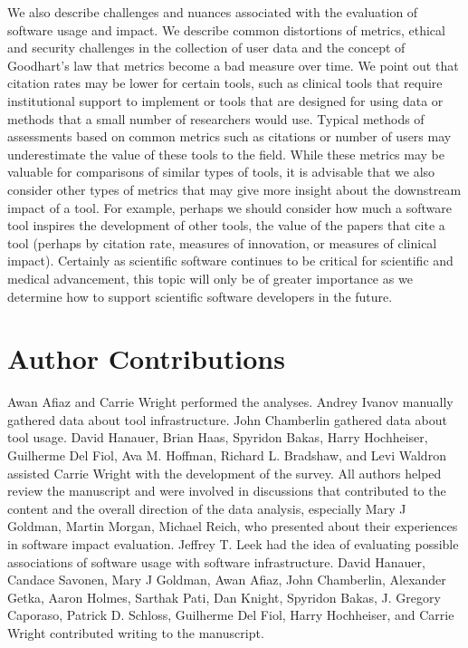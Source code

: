 \documentclass{article}
\begin{document}
We also describe challenges and nuances associated with the evaluation of software usage and impact. We describe common distortions of metrics, ethical and security challenges in the collection of user data and the concept of Goodhart's law that metrics become a bad measure over time. We point out that citation rates may be lower for certain tools, such as clinical tools that require institutional support to implement or tools that are designed for using data or methods that a small number of researchers would use. Typical methods of assessments based on common metrics such as citations or number of users may underestimate the value of these tools to the field. While these metrics may be valuable for comparisons of similar types of tools, it is advisable that we also consider other types of metrics that may give more insight about the downstream impact of a tool. For example, perhaps we should consider how much a software tool inspires the development of other tools, the value of the papers that cite a tool (perhaps by citation rate, measures of innovation, or measures of clinical impact). Certainly as scientific software continues to be critical for scientific and medical advancement, this topic will only be of greater importance as we determine how to support scientific software developers in the future. 
 
 
\section{Author Contributions}


Awan Afiaz and Carrie Wright performed the analyses. Andrey Ivanov manually gathered data about tool infrastructure. John Chamberlin gathered data about tool usage. David Hanauer, Brian Haas, Spyridon Bakas, Harry Hochheiser, Guilherme Del Fiol, Ava M. Hoffman, Richard L. Bradshaw, and Levi Waldron assisted Carrie Wright with the development of the survey.  All authors helped review the manuscript and were involved in discussions that contributed to the content and the overall direction of the data analysis, especially Mary J Goldman, Martin Morgan, Michael Reich, who presented about their experiences in software impact evaluation. Jeffrey T. Leek had the idea of evaluating possible associations of software usage with software infrastructure. David Hanauer, Candace Savonen, Mary J Goldman, Awan Afiaz, John Chamberlin, Alexander Getka, Aaron Holmes, Sarthak Pati, Dan Knight,  Spyridon Bakas, J. Gregory Caporaso, Patrick D. Schloss, Guilherme Del Fiol, Harry Hochheiser, and Carrie Wright contributed writing to the manuscript. 
\end{document}
